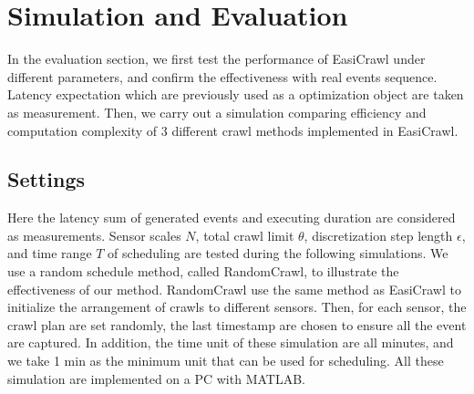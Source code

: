 \documentclass[conference]{IEEEtran}
\begin{document}
\section{Simulation and Evaluation} \label{simulation}

In the evaluation section, we first test the performance of EasiCrawl under different parameters, and confirm the effectiveness with real events sequence. Latency expectation which are previously used as a optimization object are taken as measurement.
Then, we carry out a simulation comparing efficiency and computation complexity of 3 different crawl methods implemented in EasiCrawl. 
\subsection{Settings}
Here the latency sum of generated events and executing duration are considered as measurements.
Sensor scales $N$, total crawl limit $\theta$, discretization step length $\epsilon$, and time range $T$ of scheduling are tested during the following simulations. We use a random schedule method, called RandomCrawl, to illustrate the effectiveness of our method. RandomCrawl use the same method as EasiCrawl to initialize the arrangement of crawls to different sensors. Then, for each sensor, the crawl plan are set randomly, the last timestamp are chosen to ensure all the event are captured. In addition, the time unit of these simulation are all minutes, and we take 1 min as the minimum unit that can be used for scheduling.
All these simulation are implemented on a PC with MATLAB.
\end{document}
